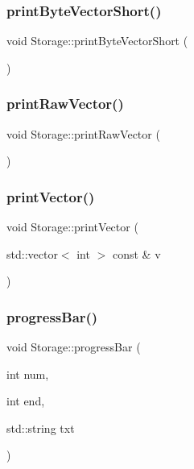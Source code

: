 \mbox{\label{class_storage_af2c170f7521a99468e334c95a542f399}} 
\subsubsection{print\+Byte\+Vector\+Short()}
{\footnotesize\ttfamily void Storage\+::print\+Byte\+Vector\+Short (\begin{DoxyParamCaption}{ }\end{DoxyParamCaption})}

\mbox{\label{class_storage_a9c875a4c268b989f13aabf299ff6268e}} 
\subsubsection{print\+Raw\+Vector()}
{\footnotesize\ttfamily void Storage\+::print\+Raw\+Vector (\begin{DoxyParamCaption}{ }\end{DoxyParamCaption})}

\mbox{\label{class_storage_ad053d05f06bfa7eb034457902bfcf840}} 
\subsubsection{print\+Vector()}
{\footnotesize\ttfamily void Storage\+::print\+Vector (\begin{DoxyParamCaption}\item[{std\+::vector$<$ int $>$ const \&}]{v }\end{DoxyParamCaption})}

\mbox{\label{class_storage_a9952af852b2676ede3fa5b3cd0b1be63}} 
\subsubsection{progress\+Bar()}
{\footnotesize\ttfamily void Storage\+::progress\+Bar (\begin{DoxyParamCaption}\item[{int}]{num,  }\item[{int}]{end,  }\item[{std\+::string}]{txt }\end{DoxyParamCaption})\hspace{0.3cm}{\ttfamily [protected]}}

